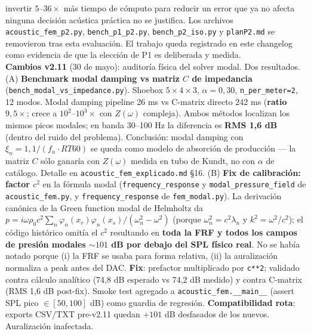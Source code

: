 \documentclass[11pt, a4paper]{article}
\begin{document}
\begin{center}
{    invertir $5$--$36\times$ más tiempo de cómputo para reducir un error
    que ya no afecta ninguna decisión acústica práctica no se justifica.
    Los archivos \texttt{acoustic\_fem\_p2.py},
    \texttt{bench\_p1\_p2.py}, \texttt{bench\_p2\_iso.py} y
    \texttt{planP2.md} se removieron tras esta evaluación. El trabajo
    queda registrado en este changelog como evidencia de que la
    elección de P1 es deliberada y medida.\\[2pt]
    \textbf{Cambios v2.11} (30 de mayo): auditoría física del solver
    modal. Dos resultados.
    (A) \textbf{Benchmark modal damping vs matriz $C$ de impedancia}
    (\texttt{bench\_modal\_vs\_impedance.py}). Shoebox $5\times 4\times 3$,
    $\alpha=0{,}30$, \texttt{n\_per\_meter=2}, 12 modos. Modal damping
    pipeline 26 ms vs C-matrix directo 242 ms (\textbf{ratio $9{,}5\times$};
    crece a $10^2$--$10^3 \times$ con $Z(\omega)$ compleja). Ambos métodos
    localizan los mismos picos modales; en banda 30--100 Hz la diferencia
    es \textbf{RMS 1{,}6 dB} (dentro del ruido del problema). Conclusión:
    modal damping con $\xi_n = 1{,}1/(f_n \cdot RT60)$ se queda como
    modelo de absorción de producción --- la matriz $C$ sólo ganaría con
    $Z(\omega)$ medida en tubo de Kundt, no con $\alpha$ de catálogo.
    Detalle en \texttt{acoustic\_fem\_explicado.md} §16.
    (B) \textbf{Fix de calibración: factor $c^2$} en la fórmula modal
    (\texttt{frequency\_response} y \texttt{modal\_pressure\_field} de
    \texttt{acoustic\_fem.py}, y \texttt{frequency\_response} de
    \texttt{fem\_modal.py}). La derivación canónica de la Green function
    modal de Helmholtz da
    $p = i\omega\rho_0 c^2 \sum_n \varphi_n(x_r)\varphi_n(x_s)/(\omega_n^2 - \omega^2)$
    (porque $\omega_n^2 = c^2 \lambda_n$ y $k^2 = \omega^2/c^2$); el
    código histórico omitía el $c^2$ resultando en \textbf{toda la FRF y
    todos los campos de presión modales $\sim 101$ dB por debajo del SPL
    físico real}. No se había notado porque (i) la FRF se usaba para
    forma relativa, (ii) la auralización normaliza a peak antes del DAC.
    \textbf{Fix}: prefactor multiplicado por \texttt{c**2}; validado
    contra cálculo analítico (74{,}8 dB esperado vs 74{,}2 dB medido) y
    contra C-matrix (RMS 1{,}6 dB post-fix). Smoke test agregado a
    \texttt{acoustic\_fem.\_\_main\_\_} (assert SPL pico $\in [50, 100]$
    dB) como guardia de regresión. \textbf{Compatibilidad rota}: exports
    CSV/TXT pre-v2.11 quedan $+101$ dB desfasados de los nuevos.
    Auralización inafectada.\\[2pt]
}
\end{center}
\end{document}
